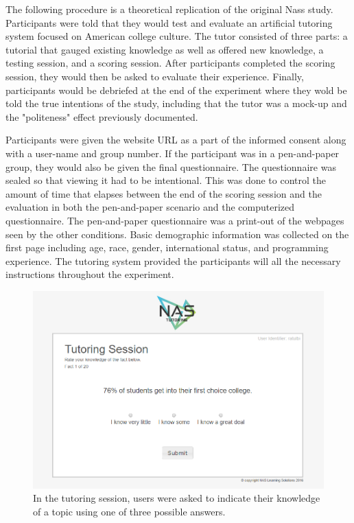 \documentclass{sig-alternate-05-2015}
\begin{document}
The following procedure is a theoretical replication of the original Nass study.   Participants were told that they would test and evaluate an artificial tutoring system focused on American college culture.  The tutor consisted of three parts: a tutorial that gauged existing knowledge as well as offered new knowledge, a testing session, and a scoring session.  After participants completed the scoring session, they would then be asked to evaluate their experience.  Finally, participants would be debriefed at the end of the experiment where they wold be told the true intentions of the study, including that the tutor was a mock-up and the "politeness" effect previously documented.    

Participants were given the website URL as a part of the informed consent along with a user-name and group number.  If the participant was in a pen-and-paper group, they would also be given the final questionnaire.  The questionnaire was sealed so that viewing it had to be intentional.  This was done to control the amount of time that elapses between the end of the scoring session and the evaluation in both the pen-and-paper scenario and the computerized questionnaire.  The pen-and-paper questionnaire was a print-out of the webpages seen by the other conditions.  Basic demographic information was collected on the first page including age, race, gender, international status, and programming experience. The tutoring system provided the participants will all the necessary instructions throughout the experiment.  


\begin{figure}[!h]
    \includegraphics[width=\linewidth]{figures/website/04_tutoring.png}
    \caption{In the tutoring session, users were asked to indicate their knowledge of a topic using one of three possible answers.}
    \label{TutorFigure}
\end{figure}
\end{document}
